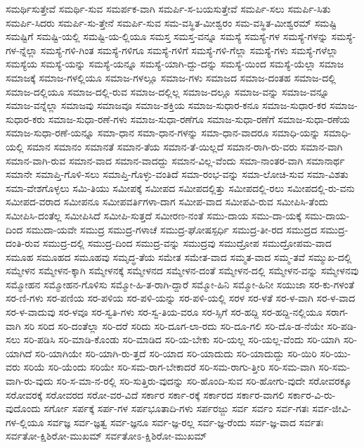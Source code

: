 {ಸಮರ್ಥಿಸುತ್ತೇವೆ
ಸಮರ್ಥಿ-ಸುವ
ಸಮರ್ಪಕ-ವಾಗಿ
ಸಮರ್ಪಿ-ಸ-ಬಯಸುತ್ತೇವೆ
ಸಮರ್ಪಿ-ಸಲು
ಸಮರ್ಪಿ-ಸಿತು
ಸಮರ್ಪಿ-ಸಿದರು
ಸಮರ್ಪಿ-ಸು-ತ್ತೇನೆ
ಸಮರ್ಪಿ-ಸುವ
ಸಮ-ವಸ್ಥಿತ-ಮೀಶ್ವರಂ
ಸಮ-ವಸ್ಥಿತ-ಮೀಶ್ವರಮ್
ಸಮಷ್ಟಿ
ಸಮಷ್ಟಿಗೆ
ಸಮಷ್ಟಿ-ಯಲ್ಲಿ
ಸಮಷ್ಟಿ-ಯ-ಲ್ಲಿಯೂ
ಸಮಸ್ತ
ಸಮಸ್ತ-ವನ್ನೂ
ಸಮಸ್ಯೆ
ಸಮಸ್ಯೆ-ಗಳ
ಸಮಸ್ಯೆ-ಗಳನ್ನು
ಸಮಸ್ಯೆ-ಗಳ-ನ್ನೆಲ್ಲಾ
ಸಮಸ್ಯೆ-ಗಳಿ-ಗಿಂತ
ಸಮಸ್ಯೆ-ಗಳಿಗೂ
ಸಮಸ್ಯೆ-ಗಳಿಗೆ
ಸಮಸ್ಯೆ-ಗಳಿ-ಗೆಲ್ಲಾ
ಸಮಸ್ಯೆ-ಗಳು
ಸಮಸ್ಯೆ-ಗಳೆಲ್ಲಾ
ಸಮಸ್ಯೆಯ
ಸಮಸ್ಯೆ-ಯನ್ನು
ಸಮಸ್ಯೆ-ಯನ್ನೂ
ಸಮಸ್ಯೆ-ಯಾಗಿ-ದ್ದು-ದನ್ನು
ಸಮಸ್ಯೆ-ಯಿಂದ
ಸಮಸ್ಯೆ-ಯೆಲ್ಲಾ
ಸಮಾಜ
ಸಮಾಜಕ್ಕೆ
ಸಮಾಜ-ಗಳಲ್ಲಿಯೂ
ಸಮಾಜ-ಗಳಲ್ಲೂ
ಸಮಾಜ-ಗಳು
ಸಮಾಜದ
ಸಮಾಜ-ದಂತಹ
ಸಮಾಜ-ದಲ್ಲಿ
ಸಮಾಜ-ದಲ್ಲಿಯೂ
ಸಮಾಜ-ದಲ್ಲಿ-ರುವ
ಸಮಾಜ-ದಲ್ಲಿಲ್ಲ
ಸಮಾಜ-ದಲ್ಲೂ
ಸಮಾಜ-ವನ್ನು
ಸಮಾಜ-ವನ್ನೂ
ಸಮಾಜ-ವನ್ನೆಲ್ಲಾ
ಸಮಾಜವು
ಸಮಾಜವೂ
ಸಮಾಜ-ಶಕ್ತಿಯ
ಸಮಾಜ-ಸುಧಾರ-ಕನೂ
ಸಮಾಜ-ಸುಧಾರ-ಕರ
ಸಮಾಜ-ಸುಧಾರ-ಕರು
ಸಮಾಜ-ಸುಧಾ-ರಣೆ-ಗಳು
ಸಮಾಜ-ಸುಧಾ-ರಣೆಗೂ
ಸಮಾಜ-ಸುಧಾ-ರಣೆಗೆ
ಸಮಾಜ-ಸುಧಾ-ರಣೆಯ
ಸಮಾಜ-ಸುಧಾ-ರಣೆ-ಯನ್ನೂ
ಸಮಾ-ಧಾನ
ಸಮಾ-ಧಾನ-ಗಳನ್ನು
ಸಮಾ-ಧಾನ-ವಾದರೂ
ಸಮಾಧಿ-ಯನ್ನು
ಸಮಾಧಿ-ಯಲ್ಲಿ
ಸಮಾನ
ಸಮಾನಂ
ಸಮಾನತೆ
ಸಮಾನ-ತೆಯ
ಸಮಾನ-ತೆ-ಯಿಲ್ಲದೆ
ಸಮಾನ-ರಾಗಿ-ರು-ವರು
ಸಮಾನ-ವಾಗಿ
ಸಮಾನ-ವಾಗಿ-ರುವ
ಸಮಾನ-ವಾದ
ಸಮಾನ-ವಾದದ್ದು
ಸಮಾನ-ವಿಲ್ಲ-ವೆಂದು
ಸಮಾ-ನಾಂತರ-ವಾಗಿ
ಸಮಾನಾರ್ಥ
ಸಮಾನೇ
ಸಮಾಪ್ತಿ-ಗೊಳಿ-ಸಲು
ಸಮಾಪ್ತಿ-ಗೊಳ್ಳು-ವಂತಿದೆ
ಸಮಾ-ರಂಭ-ವನ್ನು
ಸಮಾ-ಲೋಚಿ-ಸುವ
ಸಮಾ-ವಿಶತು
ಸಮಾ-ವೇಶಗೊಳ್ಳಲು
ಸಮಿ-ತಿಯು
ಸಮೀಪಕ್ಕೆ
ಸಮೀಪದ
ಸಮೀಪದಲ್ಲಿತ್ತು
ಸಮೀಪದಲ್ಲಿ-ರಲು
ಸಮೀಪದಲ್ಲಿ-ರು-ವನು
ಸಮೀಪದ-ವರಾದ
ಸಮೀಪನೂ
ಸಮೀಪವರ್ತಿಗಳಾ-ದಾಗ
ಸಮೀಪ-ವಾದ
ಸಮೀಪವಿ-ರುವ
ಸಮೀಪಿಸಿ-ತೆಂದು
ಸಮೀಪಿಸಿ-ದಂತೆಲ್ಲ
ಸಮೀಪಿಸಿದೆ
ಸಮೀಪಿ-ಸುತ್ತದೆ
ಸಮೀರಣ-ನಂತೆ
ಸಮು-ದಾಯ
ಸಮು-ದಾ-ಯಕ್ಕೆ
ಸಮು-ದಾಯ-ದಿಂದ
ಸಮುದಾ-ಯವೇ
ಸಮುದ್ರ
ಸಮುದ್ರ-ಗಳಾಚೆ
ಸಮುದ್ರ-ಘೋಷಸ್ಪರ್ಧಿ
ಸಮುದ್ರ-ತೀ-ರದ
ಸಮುದ್ರದ
ಸಮುದ್ರ-ದಂತಿ-ರುವ
ಸಮುದ್ರ-ದಲ್ಲಿ
ಸಮುದ್ರ-ದಿಂದ
ಸಮುದ್ರ-ವನ್ನು
ಸಮುದ್ರವು
ಸಮುದ್ರೋಪ
ಸಮುದ್ರೋಪಮ-ವಾದ
ಸಮೂಹ
ಸಮೂಹದ
ಸಮೂಹವು
ಸಮೃದ್ಧ-ತೆಯ
ಸಮೇತ
ಸಮೇತ-ವಾದ
ಸಮ್ಮತ-ವಾದ
ಸಮ್ಮ-ತವೆ
ಸಮ್ಮುಖ-ದಲ್ಲಿ
ಸಮ್ಮೇಳನ
ಸಮ್ಮೇಳನ-ಕ್ಕಾಗಿ
ಸಮ್ಮೇಳನಕ್ಕೆ
ಸಮ್ಮೇಳನದ
ಸಮ್ಮೇಳನ-ದಂತೆ
ಸಮ್ಮೇಳನ-ದಲ್ಲಿ
ಸಮ್ಮೇಳನ-ವನ್ನು
ಸಮ್ಮೇಳನವು
ಸಮ್ಮೋಹನ
ಸಮ್ಮೋಹನ-ಗೊಳಿಸು
ಸಮ್ಮೋ-ಹಿ-ತ-ರಾಗಿ-ದ್ದಾರೆ
ಸಮ್ಮೋ-ಹಿನಿ
ಸಮ್ಮೋ-ಹಿನೀ
ಸಯುಜಾ
ಸರ-ಕು-ಗಳಂತೆ
ಸರ-ಣಿ-ಗಳು
ಸರ-ಪಣಿಯ
ಸರ-ಪಳಿಯ
ಸರ-ಪಳಿ-ಯನ್ನು
ಸರ-ಪಳಿ-ಯಲ್ಲಿ
ಸರಳ
ಸರ-ಳತೆ
ಸರ-ಳ-ವಾಗಿ
ಸರ-ಳ-ವಾದ
ಸರ-ಳ-ವಾದುವು
ಸರ-ಳವೂ
ಸರ-ಸ್ವತಿ-ಗಳು
ಸರ-ಸ್ವ-ತಿಯ-ವರೂ
ಸರ-ಸ್ಸಿಗೆ
ಸರ-ಹದ್ದಿ
ಸರ-ಹದ್ದಿ-ನಲ್ಲಿಯೂ
ಸರಾಗ-ವಾಗಿ
ಸರಿ
ಸರಿದ
ಸರಿ-ದಂತೆಲ್ಲಾ
ಸರಿ-ದರೆ
ಸರಿದು
ಸರಿ-ದೂಗ-ಲಾ-ರದು
ಸರಿ-ದೂ-ಗಲಿ
ಸರಿ-ದೊ-ಡ-ನೆಯೇ
ಸರಿ-ಪಡಿ-ಸಲು
ಸರಿ-ಪಡಿಸಿ
ಸರಿ-ಮಾಡಿ-ಕೊಂಡು
ಸರಿ-ಮಾಡಿದ
ಸರಿ-ಯ-ಬೇಕು
ಸರಿ-ಯಲ್ಲ
ಸರಿ-ಯಲ್ಲ-ವೆಂದು
ಸರಿ-ಯಾಗಿ
ಸರಿ-ಯಾಗಿದೆ
ಸರಿ-ಯಾಗಿಯೇ
ಸರಿ-ಯಾಗಿ-ರು-ತ್ತದೆ
ಸರಿ-ಯಾದ
ಸರಿ-ಯಾದುದು
ಸರಿ-ಯಾದುದ್ದು
ಸರಿ-ಯಿರಿ
ಸರಿ-ಯು-ವರು
ಸರಿಯೆ
ಸರಿ-ಯೆಂದು
ಸರಿಯೇ
ಸರಿ-ಸಮ-ರಾಗ-ಬೇಕಾದರೆ
ಸರಿ-ಸಮ-ರಾಗು-ತ್ತೀರಿ
ಸರಿ-ಸಮ-ವಾಗಿ
ಸರಿ-ಸಮ-ವಾಗಿ-ರು-ವುದು
ಸರಿ-ಸ-ಮಾ-ನ-ರಲ್ಲಿ
ಸರಿ-ಸುತ್ತಿರು-ವುದನ್ನು
ಸರಿ-ಹೊಂದಿ-ಸುವ
ಸರಿ-ಹೋಗು-ವುದೇ
ಸರೋವರಕ್ಕೂ
ಸರೋವರಕ್ಕೆ
ಸರೋವರದ
ಸರೋ-ವರ-ವಿದೆ
ಸರ್ಕಾರ
ಸರ್ಕಾ-ರಕ್ಕೆ
ಸರ್ಕಾರದ
ಸರ್ಕಾರ-ವಾಗಲಿ
ಸರ್ಕಾರ-ವಿ-ರು-ವುದೊಂದು
ಸರ್ಗೋ
ಸರ್ಪಕ್ಕೆ
ಸರ್ಪ-ಗಳ
ಸರ್ಪಭೂತಾದಿ-ಗಳು
ಸರ್ಪರಜ್ಜು
ಸರ್ವ
ಸರ್ವಂ
ಸರ್ವ-ಗತಃ
ಸರ್ವ-ಜೀವಿ-ಗಳ-ಲ್ಲಿಯೂ
ಸರ್ವಜ್ಞ
ಸರ್ವ-ಜ್ಞತ್ವ
ಸರ್ವ-ಜ್ಞನೂ
ಸರ್ವ-ಜ್ಞ-ರಲ್ಲ
ಸರ್ವ-ಜ್ಞ-ರೆಂದು
ಸರ್ವ-ಜ್ಞ-ವಾದ
ಸರ್ವತಃ
ಸರ್ವತೋ-ಕ್ಷಿಶಿರೋ-ಮುಖಮ್
ಸರ್ವತೋಽ-ಕ್ಷಿಶಿರೋ-ಮುಖಮ್
}

